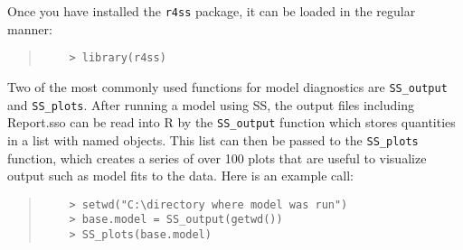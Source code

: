 Once you have installed the \texttt{r4ss} package, it can be loaded in the regular manner:

\begin{quote}
	\begin{verbatim}
	> library(r4ss)
	\end{verbatim}
\end{quote}

Two of the most commonly used functions for model diagnostics are \texttt{SS\_output} and \texttt{SS\_plots}. After running a model using SS, the output files including Report.sso can be read into R by the \texttt{SS\_output} function which stores quantities in a list with named objects.  This list can then be passed to the \texttt{SS\_plots} function, which creates a series of over 100 plots that are useful to visualize output such as model fits to the data. Here is an example call:

\begin{quote}
	\begin{verbatim}
	> setwd("C:\directory where model was run")
	> base.model = SS_output(getwd())
	> SS_plots(base.model)
	\end{verbatim}
\end{quote}
  
